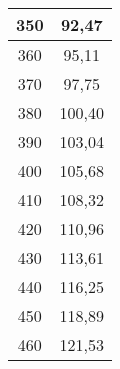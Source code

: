 \begin{table}[!ht]
\begin{tabular}{|c|c|}
      350 & 92,47 \\ \hline
      360 & 95,11 \\ \hline
      370 & 97,75 \\ \hline
      380 & 100,40 \\ \hline
      390 & 103,04 \\ \hline
      400 & 105,68 \\ \hline
      410 & 108,32 \\ \hline
      420 & 110,96 \\ \hline
      430 & 113,61 \\ \hline
      440 & 116,25 \\ \hline
      450 & 118,89 \\ \hline
      460 & 121,53 \\ \hline
  \end{tabular}
\end{table}

\newpage

